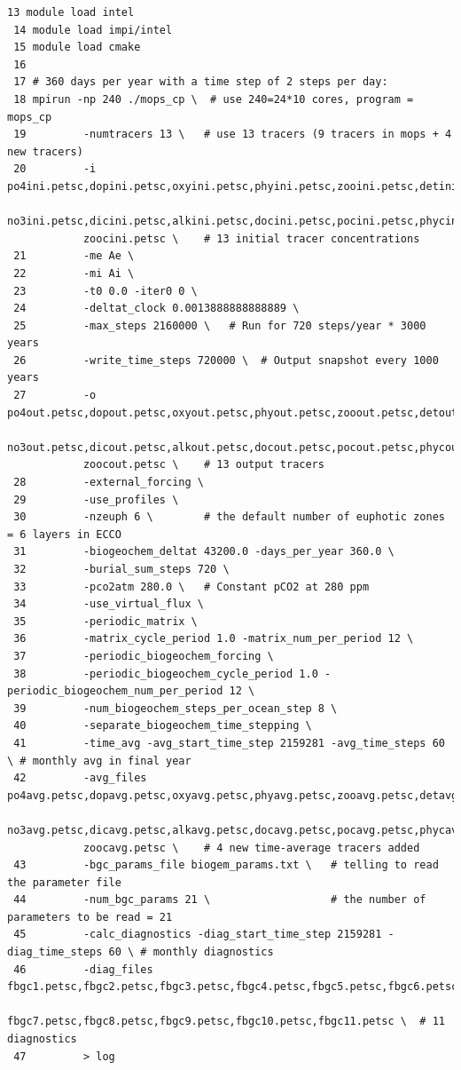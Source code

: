 \documentclass[a4paper]{article}
\begin{document}
\begin{enumerate}
\lstset{language=sh} 
\begin{lstlisting}[frame=single,basicstyle=\scriptsize,commentstyle=\color{blue}]
 13 module load intel
 14 module load impi/intel
 15 module load cmake
 16
 17 # 360 days per year with a time step of 2 steps per day:
 18 mpirun -np 240 ./mops_cp \  # use 240=24*10 cores, program = mops_cp
 19         -numtracers 13 \   # use 13 tracers (9 tracers in mops + 4 new tracers)
 20         -i po4ini.petsc,dopini.petsc,oxyini.petsc,phyini.petsc,zooini.petsc,detini.petsc,
            no3ini.petsc,dicini.petsc,alkini.petsc,docini.petsc,pocini.petsc,phycini.petsc,
            zoocini.petsc \    # 13 initial tracer concentrations
 21         -me Ae \
 22         -mi Ai \
 23         -t0 0.0 -iter0 0 \
 24         -deltat_clock 0.0013888888888889 \
 25         -max_steps 2160000 \   # Run for 720 steps/year * 3000 years
 26         -write_time_steps 720000 \  # Output snapshot every 1000 years
 27         -o po4out.petsc,dopout.petsc,oxyout.petsc,phyout.petsc,zooout.petsc,detout.petsc,
            no3out.petsc,dicout.petsc,alkout.petsc,docout.petsc,pocout.petsc,phycout.petsc,
            zoocout.petsc \    # 13 output tracers 
 28         -external_forcing \
 29         -use_profiles \
 30         -nzeuph 6 \        # the default number of euphotic zones = 6 layers in ECCO 
 31         -biogeochem_deltat 43200.0 -days_per_year 360.0 \
 32         -burial_sum_steps 720 \
 33         -pco2atm 280.0 \   # Constant pCO2 at 280 ppm
 34         -use_virtual_flux \
 35         -periodic_matrix \
 36         -matrix_cycle_period 1.0 -matrix_num_per_period 12 \
 37         -periodic_biogeochem_forcing \
 38         -periodic_biogeochem_cycle_period 1.0 -periodic_biogeochem_num_per_period 12 \
 39         -num_biogeochem_steps_per_ocean_step 8 \
 40         -separate_biogeochem_time_stepping \
 41         -time_avg -avg_start_time_step 2159281 -avg_time_steps 60 \ # monthly avg in final year
 42         -avg_files po4avg.petsc,dopavg.petsc,oxyavg.petsc,phyavg.petsc,zooavg.petsc,detavg.petsc,
            no3avg.petsc,dicavg.petsc,alkavg.petsc,docavg.petsc,pocavg.petsc,phycavg.petsc,
            zoocavg.petsc \    # 4 new time-average tracers added 
 43         -bgc_params_file biogem_params.txt \   # telling to read the parameter file
 44         -num_bgc_params 21 \                   # the number of parameters to be read = 21
 45         -calc_diagnostics -diag_start_time_step 2159281 -diag_time_steps 60 \ # monthly diagnostics 
 46         -diag_files fbgc1.petsc,fbgc2.petsc,fbgc3.petsc,fbgc4.petsc,fbgc5.petsc,fbgc6.petsc,
            fbgc7.petsc,fbgc8.petsc,fbgc9.petsc,fbgc10.petsc,fbgc11.petsc \  # 11 diagnostics 
 47         > log
\end{lstlisting}
 

\end{enumerate}
\end{document}
